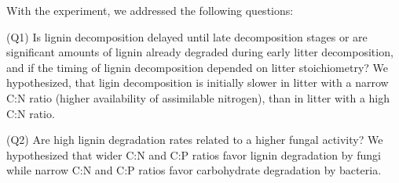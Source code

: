 With the experiment, we addressed the following questions:

(Q1) Is lignin decomposition delayed until late decomposition stages or are significant amounts of lignin already degraded during early litter decomposition, and if the timing of lignin decomposition depended on litter stoichiometry? We hypothesized, that ligin decomposition is initially slower in litter with a narrow C:N ratio (higher availability of assimilable nitrogen), than in litter with a high C:N ratio.

(Q2) Are high lignin degradation rates related to a higher fungal activity? We hypothesized that wider C:N and C:P ratios favor lignin degradation by fungi while narrow C:N and C:P ratios favor carbohydrate degradation by bacteria. 